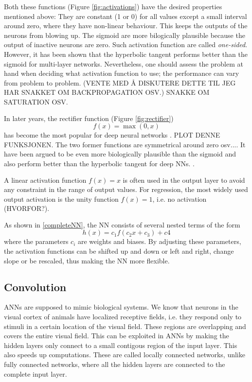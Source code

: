\documentclass[twoside,english]{uiofysmaster}
\begin{document}
Both these functions (Figure \ref{fig:activations}) have the desired properties mentioned above:
They are constant (1 or 0) for all values except a small interval around zero, where they have non-linear behaviour. 
This keeps the outputs of the neurons from blowing up. The sigmoid are more bilogically plausible because 
the output of inactive neurons are zero. Such activation function are called \textit{one-sided}. However,
it has been shown \cite{Karlik11} that the hyperbolic tangent 
performs better than the sigmoid for multi-layer networks. Nevertheless, one should assess the problem 
at hand when deciding what activation function to use; the performance can vary from problem to problem. 
(VENTE MED Å DISKUTERE DETTE TIL JEG HAR SNAKKET OM BACKPROPAGATION OSV.)
SNAKKE OM SATURATION OSV. 

In later years, the rectifier function (Figure \ref{fig:rectifier})
\begin{equation}
 f(x) = \max(0,x)
\end{equation}
has become the most popular for deep neural networks \cite{LeCun15}. PLOT DENNE FUNKSJONEN.
The two former functions are symmetrical around zero osv....
It have been argued to be even more biologically plausible than the sigmoid and also perform better
than the hyperbolic tangent for deep NNs. \cite{Glorot11}. 


A linear activation function $f(x) = x$ is often used in the output layer to avoid any constraint in the range 
of output values. For regression, the most widely used output activation is the unity function $f(x) = 1$, i.e.
no activation (HVORFOR?).

As shown in \eqref{completeNN}, the NN consists of several nested terms of the form
\begin{equation}
 h(x) = c_1 f(c_2 x + c_3) + c4
\end{equation}
where the parameters $c_i$ are weights and biases. By adjusting these parameters, the activation functions
can be shifted up and down or left and right, change slope or be rescaled, thus making the NN more flexible.

\subsection{Convolution}
ANNs are supposed to mimic biological systems. We know that neurons in the visual cortex of animals have
localized receptive fields, i.e. they respond only to stimuli in a certain location of the visual field. 
These regions are overlapping and covers the entire visual field. This can be exploited in ANNs by making the hidden layers
only connect to a small contigous region of the input layer. This also speeds up computations. These are called
locally connected networks, unlike fully connected networks, where all the hidden layers are connected to the complete
input layer. 
\end{document}
